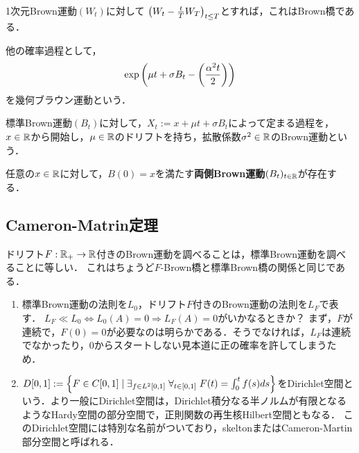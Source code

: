 \documentclass[uplatex,dvipdfmx]{jsreport}
\begin{document}
\begin{construction}
    1次元Brown運動$(W_t)$に対して
    $\left(W_t-\frac{t}{T}W_T\right)_{t\le T}$とすれば，これはBrown橋である．
\end{construction}

\begin{example}
    他の確率過程として，
    \[\exp\left(\mu t+\sigma B_t-\left(\frac{\alpha^2t}{2}\right)\right)\]
    を幾何ブラウン運動という．
\end{example}

\begin{example}
    標準Brown運動$(B_t)$に対して，$X_t:=x+\mu t+\sigma B_t$によって定まる過程を，$x\in\mathbb{R}$から開始し，$\mu\in\mathbb{R}$のドリフトを持ち，拡散係数$\sigma^2\in\mathbb{R}$のBrown運動という．
\end{example}

\begin{proposition}
    任意の$x\in\mathbb{R}$に対して，$B(0)=x$を満たす\textbf{両側Brown運動}$(B_t)_{t\in\mathbb{R}}$が存在する．
\end{proposition}

\subsection{Cameron-Matrin定理}

\begin{tcolorbox}[colframe=ForestGreen, colback=ForestGreen!10!white,breakable,colbacktitle=ForestGreen!40!white,coltitle=black,fonttitle=\bfseries\sffamily,
title=]
    ドリフト$F:\mathbb{R}_+\to\mathbb{R}$付きのBrown運動を調べることは，標準Brown運動を調べることに等しい．
    これはちょうど$F$-Brown橋と標準Brown橋の関係と同じである．
\end{tcolorbox}

\begin{notation}\mbox{}
    \begin{enumerate}
        \item 標準Brown運動の法則を$L_0$，ドリフト$F$付きのBrown運動の法則を$L_F$で表す．
        $L_F\ll L_0\Leftrightarrow L_0(A)=0\Rightarrow L_F(A)=0$がいかなるときか？
        まず，$F$が連続で，$F(0)=0$が必要なのは明らかである．そうでなければ，$L_F$は連続でなかったり，$0$からスタートしない見本道に正の確率を許してしまうため．
        \item $D[0,1]:=\left\{F\in C[0,1]\mid\exists_{f\in L^2[0,1]}\;\forall_{t\in[0,1]}\;F(t)=\int^t_0f(s)ds\right\}$をDirichlet空間という．より一般にDirichlet空間は，Dirichlet積分なる半ノルムが有限となるようなHardy空間の部分空間で，正則関数の再生核Hilbert空間ともなる．
        このDirichlet空間には特別な名前がついており，skeltonまたはCameron-Martin部分空間と呼ばれる．
    \end{enumerate}
\end{notation}
\end{document}
